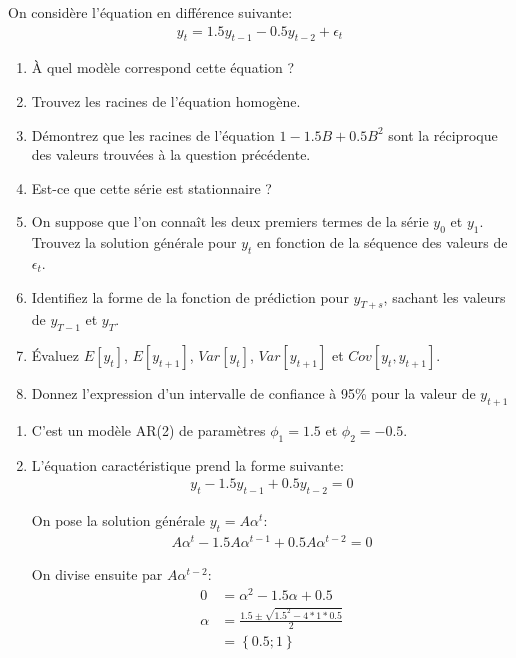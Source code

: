 \begin{exercice}
  On considère l'équation en différence suivante:
\begin{align*}
  y_t = 1.5 y_{t-1} - 0.5 y_{t-2} + \epsilon_t
\end{align*}
\begin{enumerate}
\item À quel modèle correspond cette équation ?
\item Trouvez les racines de l'équation homogène.
\item Démontrez que les racines de l'équation $1-1.5B+0.5B^2$ sont la réciproque des valeurs trouvées à la question précédente.
\item Est-ce que cette série est stationnaire ?
\item On suppose que l'on connaît les deux premiers termes de la série $y_0$ et $y_1$. Trouvez la solution générale pour $y_t$ en fonction de la séquence des valeurs de $\epsilon_t$.
\item Identifiez la forme de la fonction de prédiction pour $y_{T+s}$, sachant les valeurs de $y_{T-1}$ et $y_T$.
\item Évaluez $E[y_t]$, $E[y_{t+1}]$, $Var[y_t]$, $Var[y_{t+1}]$ et $Cov[y_{t},y_{t+1}]$.
\item Donnez l'expression d'un intervalle de confiance à 95\% pour la valeur de $y_{t+1}$ 
\end{enumerate}
\begin{sol}
  \begin{enumerate}
\item C'est un modèle AR(2) de paramètres $\phi_1=1.5$ et $\phi_2=-0.5$.
\item L'équation caractéristique prend la forme suivante:
  \begin{align*}
    y_t - 1.5 y_{t-1} + 0.5y_{t-2} = 0
  \end{align*}
  
  On pose la solution générale $y_t=A\alpha^t$:
  \begin{align*}
    A\alpha^t - 1.5 A\alpha^{t-1} + 0.5A\alpha^{t-2} = 0
  \end{align*}
  
  On divise ensuite par $A\alpha^{t-2}$:
  \begin{align*}
    0 &= \alpha^2 - 1.5 \alpha + 0.5\\
    \alpha &= \frac{1.5 \pm \sqrt{1.5^2-4*1*0.5}}{2} \\
    &= \left\{0.5 ; 1 \right\}
  \end{align*}


\end{enumerate}
\end{sol}
\end{exercice}
